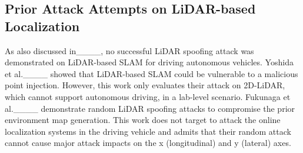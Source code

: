 \subsection{Prior Attack Attempts on LiDAR-based Localization} \label{sec:prior_attack}
As also discussed in____, no successful LiDAR spoofing attack was demonstrated on LiDAR-based SLAM for driving autonomous vehicles. Yoshida et al.____ showed that LiDAR-based SLAM could be vulnerable to a malicious point injection. However, this work only evaluates their attack on 2D-LiDAR, which cannot support autonomous driving, in a lab-level scenario. %
Fukunaga et al.____ demonstrate random LiDAR spoofing attacks to compromise the prior environment map generation. This work does not target to attack the online localization systems in the driving vehicle and admits that their random attack cannot cause major attack impacts on the x (longitudinal) and y (lateral) axes. %


